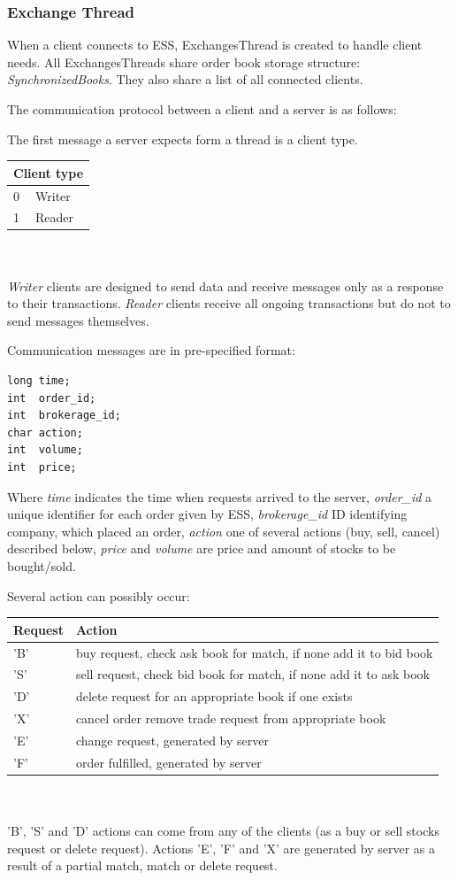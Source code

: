 \documentclass[14pt]{article}
\begin{document}
\subsubsection{Exchange Thread}
When a client connects to ESS, ExchangesThread is created to handle client
needs. All ExchangesThreads share order book storage structure:
\emph{SynchronizedBooks}. They also share a list of all connected clients.

\noindent The communication protocol between a client and a server is as follows: 

\noindent The first message a server expects form a thread is a client type.

\begin{tabular}{|l|l|}
  \hline
  \multicolumn{2}{|c|}{Client type} \\
  \hline
  0 & Writer\\ \hline
  1 & Reader \\
  \hline
\end{tabular}
\\
\\
\emph{Writer} clients are designed to send data and receive messages only as a response to their transactions. \emph{Reader} clients receive all ongoing transactions but do not to send messages themselves.

Communication messages  are in pre-specified format:

\begin{Verbatim}
long time;
int  order_id;
int  brokerage_id;
char action;
int  volume;
int  price;
\end{Verbatim}

Where \emph{time} indicates the time when requests arrived to the server,
\emph{order\_id} a unique identifier for each order given by ESS,
\emph{brokerage\_id} ID identifying company, which placed an order,
\emph{action} one of several actions (buy, sell, cancel) described below,
\emph{price} and \emph{volume} are price and amount of stocks to be bought/sold.

\noindent Several action can possibly occur:

\begin{tabular}{|l|l|}
  \hline
  Request & Action \\ \hline
  'B' & buy request, check ask book for match, if none add it to bid book \\ \hline
  'S' & sell request, check bid book for match, if none add it to ask book \\ \hline
  'D' & delete request for an appropriate book if one exists \\ \hline
  'X' & cancel order remove trade request from appropriate book\\ \hline
  'E' & change request, generated by server \\ \hline
  'F' & order fulfilled, generated by server \\
  \hline
\end{tabular}
\\
\\
\noindent 'B', 'S' and 'D' actions can come from any of the clients (as a buy or
sell stocks request or delete request). Actions 'E', 'F' and 'X' are generated
by server as a result of a partial match, match or delete request.
\end{document}
